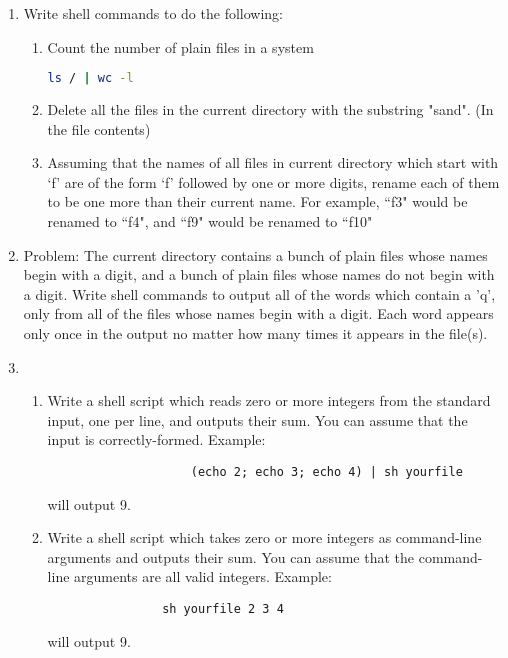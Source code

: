 \documentclass[11pt]{article}
\begin{document}
	\begin{enumerate}
		\item Write shell commands to do the following:
			\begin{enumerate}
				\item Count the number of plain files in a system
					\begin{lstlisting}[language=sh]
ls / | wc -l\end{lstlisting}
				\item Delete all the files in the current directory with the substring "sand". (In the file contents)
					
					
				\item Assuming that the names of all files in current directory which start with `f' are of the form `f' followed by one or more digits, rename each of them to be one more than their current name. For example, ``f3" would be renamed to ``f4", and ``f9" would be renamed to ``f10"
					
			\end{enumerate}
		
\newpage
		\item 
		Problem: The current directory contains a bunch of plain files whose names begin with a digit,
		and a bunch of plain files whose names do not begin with a digit. Write shell commands to
		output all of the words which contain a 'q', only from all of the files whose names begin with a digit. Each word appears only once in the output no matter how many times it appears in the file(s).
			
\newpage
		\item
			\begin{enumerate}
				\item Write a shell script which reads zero or more integers from the standard input, one per line, and outputs their sum. You can assume that the input is correctly-formed.
				Example:
				\begin{verbatim}
					(echo 2; echo 3; echo 4) | sh yourfile
				\end{verbatim} 
			will output 9.
					
					
				\item Write a shell script which takes zero or more integers as command-line arguments and outputs their sum. You can assume that the command-line arguments are all valid integers.
				Example:
				\begin{verbatim}
				sh yourfile 2 3 4
			\end{verbatim} 
		 will output 9.
		 			
			\end{enumerate}
\newpage


\end{enumerate}
\end{document}
